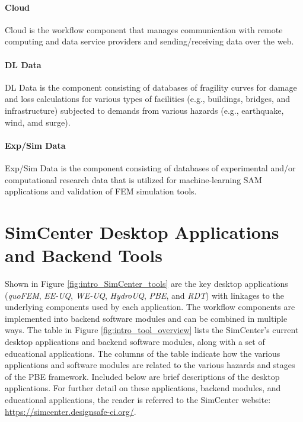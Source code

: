 \paragraph{Cloud} Cloud is the workflow component that manages communication with remote computing and data service providers and sending/receiving data over the web.

\paragraph{DL Data} DL Data is the component consisting of databases of fragility curves for damage and loss calculations for various types of facilities (e.g., buildings, bridges, and infrastructure) subjected to demands from various hazards (e.g., earthquake, wind, amd surge).

\paragraph{Exp/Sim Data} Exp/Sim Data is the component consisting of databases of experimental and/or computational research data that is utilized for machine-learning SAM applications and validation of FEM simulation tools.

\section{SimCenter Desktop Applications and Backend Tools}

Shown in Figure \ref{fig:intro_SimCenter_tools} are the key desktop applications (\emph{quoFEM}, \emph{EE-UQ}, \emph{WE-UQ}, \emph{HydroUQ}, \emph{PBE}, and \emph{RDT}) with linkages to the underlying components used by each application. The workflow components are implemented into backend software modules and can be combined in multiple ways.  The table in Figure \ref{fig:intro_tool_overview} lists the SimCenter’s current desktop applications and backend software modules, along with a set of educational applications.  The columns of the table indicate how the various applications and software modules are related to the various hazards and stages of the PBE framework. Included below are brief descriptions of the desktop applications.  For further detail on these applications, backend modules, and educational applications, the reader is referred to the SimCenter website: \url{https://simcenter.designsafe-ci.org/}. 

